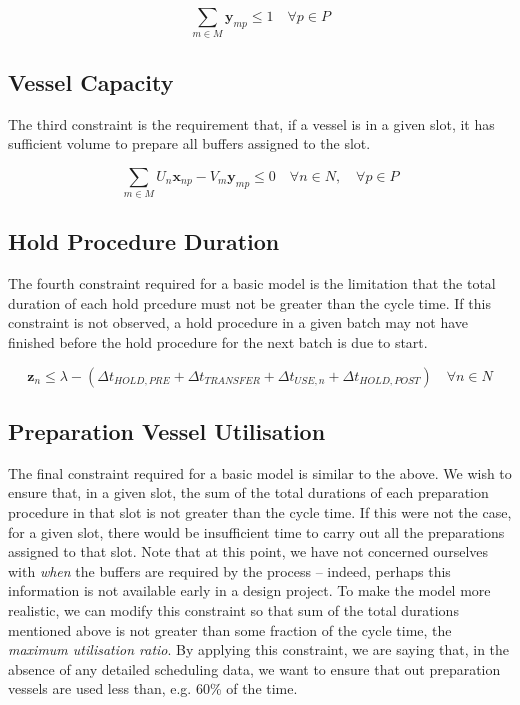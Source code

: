 \begin{equation}
    \sum_{m \in M} \boldsymbol{y}_{mp} \le 1 \quad \forall p \in P
\end{equation}

\subsection{Vessel Capacity}\label{SS.constr3}

The third constraint is the requirement that, if a vessel is in a given slot,
it has sufficient volume to prepare all buffers assigned to the slot.   
        
\begin{equation}
    \sum_{m \in M} U_{n} \boldsymbol{x}_{np} - V_{m} \boldsymbol{y}_{mp} \le 0
    \quad \forall n \in N, \quad \forall p \in P
\end{equation}

\subsection{Hold Procedure Duration}\label{SS.constr4}

The fourth constraint required for a basic model is the limitation that the
total duration of each hold prcedure must not be greater than the cycle time.
If this constraint is not observed, a hold procedure in a given batch may not
have finished before the hold procedure for the next batch is due to start.

\begin{equation}
    \boldsymbol{z}_{n} \le \lambda - \left( \Delta t_{HOLD,PRE} +
    \Delta t_{TRANSFER} + \Delta t_{USE,n} + \Delta t_{HOLD,POST} \right)
    \quad \forall n \in N
\end{equation}

\subsection{Preparation Vessel Utilisation}\label{SS.constr5}

The final constraint required for a basic model is similar to the above.
We wish to ensure that, in a given slot, the sum of the total durations of each
preparation procedure in that slot is not greater than the cycle time.
If this were not the case, for a given slot, there would be insufficient
time to carry out all the preparations assigned to that slot.
Note that at this point, we have not concerned ourselves with \emph{when}
the buffers are required by the process -- indeed, perhaps this information is
not available early in a design project.
To make the model more realistic, we can modify this constraint so that sum of
the total durations mentioned above is not greater than some fraction of the
cycle time, the \emph{maximum utilisation ratio}.
By applying this constraint, we are saying that, in the absence of any detailed
scheduling data, we want to ensure that out preparation vessels
are used less than, e.g. 60\% of the time.

